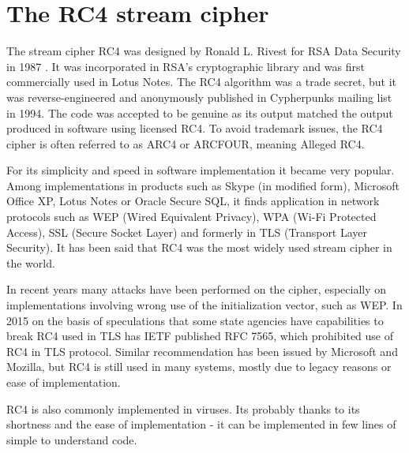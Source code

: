 \chapter{The RC4 stream cipher}
The stream cipher RC4 was designed by Ronald L. Rivest for RSA Data Security in 1987 \cite{RS14}. It was incorporated in RSA's cryptographic library and was first commercially used in Lotus Notes. The RC4 algorithm was a trade secret, but it was reverse-engineered and anonymously published in Cypherpunks mailing list  \cite{cypherpunks} in 1994. The code was accepted to be genuine as its output matched the output produced in software using licensed RC4. To avoid trademark issues, the RC4 cipher is often referred to as ARC4 or ARCFOUR, meaning Alleged RC4. 

For its simplicity and speed in software implementation it became very popular. Among implementations in products such as Skype (in modified form), Microsoft Office XP, Lotus Notes or Oracle Secure SQL, it finds application in network protocols such as WEP (Wired Equivalent Privacy), WPA (Wi-Fi Protected Access), SSL (Secure Socket Layer) and formerly in TLS (Transport Layer Security). It has been said that RC4 was the most widely used stream cipher in the world. 


In recent years many attacks have been performed on the cipher, especially on implementations involving wrong use of the initialization vector, such as WEP. In 2015 on the basis of speculations that some state agencies have capabilities to break RC4 used in TLS has IETF published RFC 7565, which prohibited use of RC4 in TLS protocol. Similar recommendation has been issued by Microsoft and Mozilla, but RC4 is still used in many systems, mostly due to legacy reasons or ease of implementation. 

RC4 is also commonly implemented in viruses. Its probably thanks to its shortness and the ease of implementation - it can be implemented in few lines of simple to understand code.


